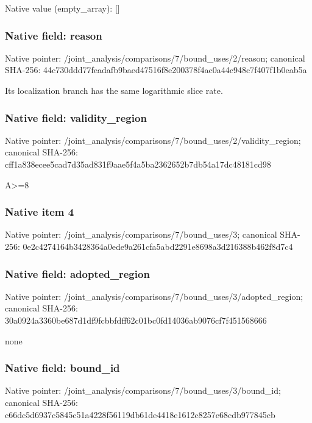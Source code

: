\documentclass[10pt,a4paper]{article}
\begin{document}
Native value (empty\_\allowbreak{}array): []

\subsubsection{Native field: reason}
Native pointer: /joint\_\allowbreak{}analysis/comparisons/7/bound\_\allowbreak{}uses/2/reason; canonical SHA-256: 44c730ddd77feadafb9baed47516f8e200378f4ac0a44c948c7f407f1b0eab5a

\begingroup\raggedright\sloppy Its localization branch has the same logarithmic slice rate.\par\endgroup

\subsubsection{Native field: validity\_\allowbreak{}region}
Native pointer: /joint\_\allowbreak{}analysis/comparisons/7/bound\_\allowbreak{}uses/2/validity\_\allowbreak{}region; canonical SHA-256: cff1a838ecee5cad7d35ad831f9aae5f4a5ba2362652b7db54a17dc48181cd98

\begingroup\raggedright\sloppy A>=\allowbreak{}8\par\endgroup

\subsubsection{Native item 4}
Native pointer: /joint\_\allowbreak{}analysis/comparisons/7/bound\_\allowbreak{}uses/3; canonical SHA-256: 0e2c4274164b3428364a0ede9a261cfa5abd2291e8698a3d216388b462f8d7c4

\subsubsection{Native field: adopted\_\allowbreak{}region}
Native pointer: /joint\_\allowbreak{}analysis/comparisons/7/bound\_\allowbreak{}uses/3/adopted\_\allowbreak{}region; canonical SHA-256: 30a0924a3360be687d1df9fcbbfdff62c01bc0fd14036ab9076cf7f451568666

\begingroup\raggedright\sloppy none\par\endgroup

\subsubsection{Native field: bound\_\allowbreak{}id}
Native pointer: /joint\_\allowbreak{}analysis/comparisons/7/bound\_\allowbreak{}uses/3/bound\_\allowbreak{}id; canonical SHA-256: c66dc5d6937c5845c51a4228f56119db61de4418e1612c8257e68cdb977845cb
\end{document}
